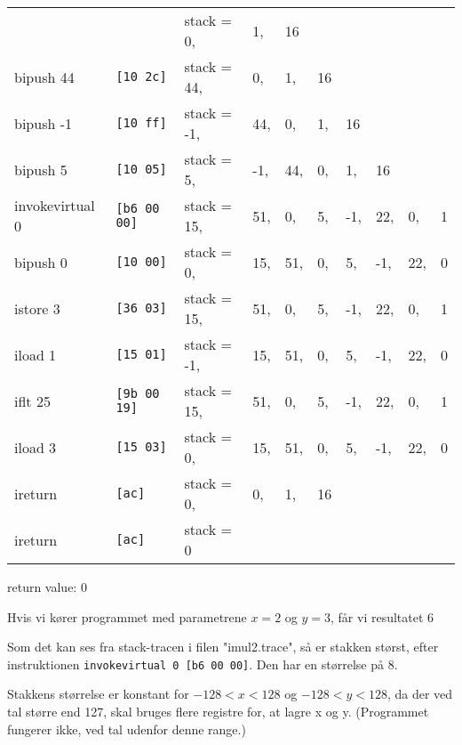 \documentclass[12pt,a4paper]{article}
\begin{document}
\begin{tabular}{llllllllll}
                &                    & stack = 0,& 1,& 16 \\
bipush 44       & \texttt{[10 2c]   }& stack = 44,& 0,& 1,& 16 \\
bipush -1       & \texttt{[10 ff]   }& stack = -1,& 44,& 0,& 1,& 16 \\
bipush 5        & \texttt{[10 05]   }& stack = 5,& -1,& 44,& 0,& 1,& 16 \\
invokevirtual 0 & \texttt{[b6 00 00]}& stack = 15,& 51,& 0,& 5,& -1,& 22,& 0,& 1 \\
bipush 0        & \texttt{[10 00]   }& stack = 0,& 15,& 51,& 0,& 5,& -1,& 22,& 0 \\
istore 3        & \texttt{[36 03]   }& stack = 15,& 51,& 0,& 5,& -1,& 22,& 0,& 1 \\
iload 1         & \texttt{[15 01]   }& stack = -1,& 15,& 51,& 0,& 5,& -1,& 22,& 0 \\
iflt 25         & \texttt{[9b 00 19]}& stack = 15,& 51,& 0,& 5,& -1,& 22,& 0,& 1 \\
iload 3         & \texttt{[15 03]   }& stack = 0,& 15,& 51,& 0,& 5,& -1,& 22,& 0 \\
ireturn         & \texttt{[ac]      }& stack = 0,& 0,& 1,& 16 \\
ireturn         & \texttt{[ac]      }& stack = 0
\end{tabular}

return value: $0$


Hvis vi kører programmet med parametrene $x=2$ og $y=3$, får vi resultatet $6$

Som det kan ses fra stack-tracen i filen "imul2.trace", så er stakken størst, efter instruktionen \texttt{invokevirtual 0 [b6 00 00]}. Den har en størrelse på $8$.

Stakkens størrelse er konstant for $-128 < x < 128$ og $-128 < y < 128$, da der ved tal større end 127, skal bruges flere registre for, at lagre x og y. (Programmet fungerer ikke, ved tal udenfor denne range.)
\end{document}

